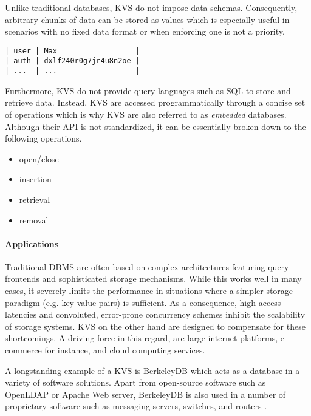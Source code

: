 Unlike traditional databases, KVS do not impose data schemas. Consequently,
arbitrary chunks of data can be stored as values which is especially useful
in scenarios with no fixed data format or when enforcing one is not a priority.

\begin{lstlisting}
| user | Max                  |
| auth | dxlf240r0g7jr4u8n2oe |
| ...  | ...                  |
\end{lstlisting}

Furthermore, KVS do not provide query languages such as SQL to
store and retrieve data. Instead, KVS are accessed programmatically through a
concise set of operations which is why KVS are also referred to as
\emph{embedded} databases. Although their API is not standardized, it can be
essentially broken down to the following operations.

\begin{itemize}
    \item open/close
    \item insertion
    \item retrieval
    \item removal
\end{itemize}

\paragraph{Applications}

Traditional DBMS are often based on complex architectures featuring query
frontends and sophisticated storage mechanisms. While this works well in many
cases, it severely limits the performance in situations where a simpler storage
paradigm (e.g. key-value pairs) is sufficient. As a consequence, high access
latencies and convoluted, error-prone concurrency schemes inhibit the
scalability of storage systems. KVS on the other hand are designed to compensate
for these shortcomings. A driving force in this regard, are large internet
platforms, e-commerce for instance, and cloud computing services.

A longstanding example of a KVS is BerkeleyDB which acts as a database in a
variety of software solutions. Apart from open-source software such as OpenLDAP
or Apache Web server, BerkeleyDB is also used in a number of proprietary
software such as messaging servers, switches, and routers
\cite{kaestner2007aspect, olson1999berkeley}.

